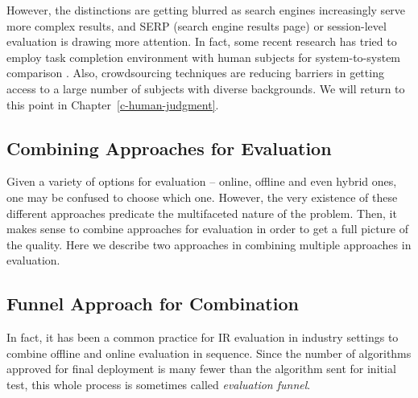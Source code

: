 However, the distinctions are getting blurred as search engines increasingly serve more complex results, and SERP (search engine results page) or session-level evaluation is drawing more attention. In fact, some recent research has tried to employ task completion environment with human subjects for system-to-system comparison \citep{Xu:2009}. Also, crowdsourcing techniques are reducing barriers in getting access to a large number of subjects with diverse backgrounds. We will return to this point in Chapter~\ref{c-human-judgment}.

\subsection{Combining Approaches for Evaluation}
Given a variety of options for evaluation -- online, offline and even hybrid ones, one may be confused to choose which one. However, the very existence of these different approaches predicate the multifaceted nature of the problem. Then, it makes sense to combine approaches for evaluation in order to get a full picture of the quality. Here we describe two approaches in combining multiple approaches in evaluation.  %


\subsection{Funnel Approach for Combination}
In fact, it has been a common practice for IR evaluation in industry settings to combine offline and online evaluation in sequence. Since the number of algorithms approved for final deployment is many fewer than the algorithm sent for initial test, this whole process is sometimes called \textit{evaluation funnel}. 


